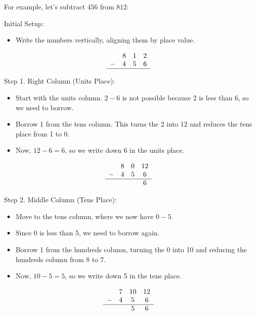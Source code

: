 For example, let’s subtract \( 456 \) from \( 812 \):

\vspace{\baselineskip}\par
Initial Setup:
  \begin{itemize}
     \item Write the numbers vertically, aligning them by place value.
     \end{itemize}
\[
\begin{array}{cccc}
    & 8 & 1 & 2 \\
  - & 4 & 5 & 6 \\
  \hline
\end{array}
\]

\vspace{\baselineskip}\par
Step 1. Right Column (Units Place):
  \begin{itemize}
   \item Start with the units column. \( 2 - 6 \) is not possible because 2 is less than 6, so we need to borrow.
   \item  Borrow 1 from the tens column. This turns the 2 into 12 and reduces the tens place from 1 to 0.
   \item Now, \( 12 - 6 = 6 \), so we write down 6 in the units place.
   \end{itemize}
\[
\begin{array}{cccc}
    & 8 & 0 & 12 \\ %
  - & 4 & 5 & 6 \\
  \hline
    & & & 6 \\
\end{array}
\]
   

\vspace{\baselineskip}\par
Step 2. Middle Column (Tens Place):
 \begin{itemize}
   \item Move to the tens column, where we now have \( 0 - 5 \).
   \item Since 0 is less than 5, we need to borrow again.
   \item Borrow 1 from the hundreds column, turning the 0 into 10 and reducing the hundreds column from 8 to 7.
   \item Now, \( 10 - 5 = 5 \), so we write down 5 in the tens place.
   \end{itemize}
\[
\begin{array}{cccc}
    & 7 & 10 & 12 \\ %
  - & 4 & 5 & 6 \\
  \hline
    & & 5 & 6 \\
\end{array}
\]
   

